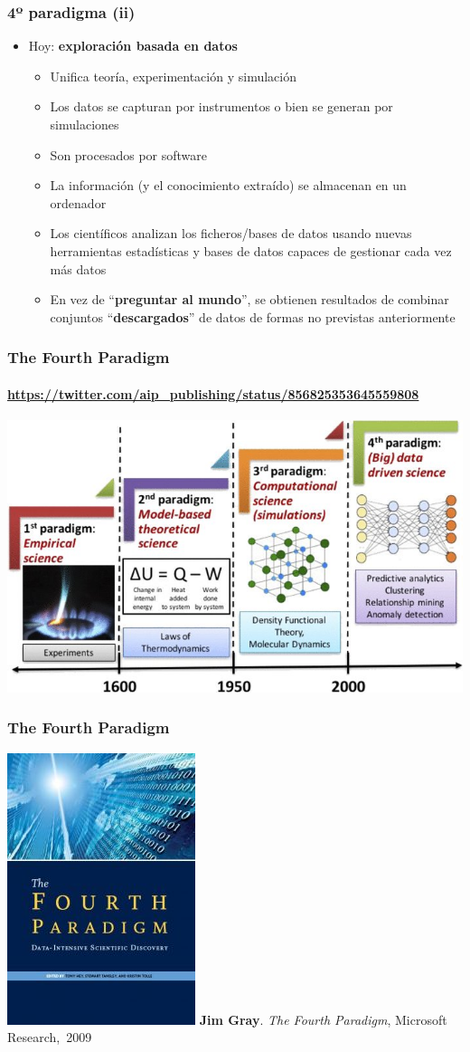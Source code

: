 \documentclass[14pt]{beamer}
\begin{document}
\begin{frame}
  \frametitle{4º paradigma (ii)}
\vspace*{-.5em}
  \begin{itemize}
  \item Hoy: {\bf exploración basada en datos}
\begin{itemize}
\item Unifica teoría, experimentación y simulación
\item Los datos se capturan por instrumentos o bien se generan por
  simulaciones
\item Son procesados por software
  \item La información (y el conocimiento extraído) se almacenan en un
    ordenador
    \item Los científicos analizan los ficheros/bases de datos usando
     nuevas herramientas estadísticas y bases de datos capaces de
     gestionar cada vez más datos
   \item En vez de ``{\bf preguntar al mundo}'', se obtienen resultados de
     combinar conjuntos ``{\bf descargados}'' de datos de formas no
     previstas anteriormente
    \end{itemize}
\end{itemize}
\end{frame}

\begin{frame}
  \frametitle{The Fourth Paradigm}
  \framesubtitle{\url{https://twitter.com/aip_publishing/status/856825353645559808}}

  \includegraphics[width=\textwidth]{img/fourth-paradigm2}
\end{frame}

\begin{frame}
  \frametitle{The Fourth Paradigm}
\includegraphics[height=12ex]{img/fourth-paradigm} {\bf Jim Gray}. {\em
    The Fourth Paradigm}, Microsoft Research,~2009
\end{frame}
\end{document}
